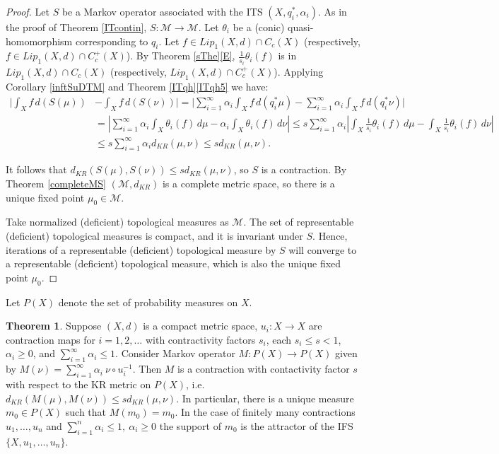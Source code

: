 \documentclass[sn-mathphys-num]{sn-jnl}%
\theoremstyle{thmstyleone}%
\theoremstyle{definition}
\newtheorem{theorem}{Theorem}%
\begin{document}
\begin{proof}
Let  $S$ be a Markov operator associated with the ITS  $(X,  q_i^*, \alpha_i)$.
As in the proof of Theorem \ref{ITcontin}, $S :  \mathcal{M} \rightarrow \mathcal{M}$. 
Let $ \theta_i$ be a (conic) quasi-homomorphism corresponding to $q_i$. Let $f  \in  Lip_1(X,d) \cap C_c(X)$ 
(respectively, $f  \in  Lip_1(X,d) \cap C_c^+(X)$).
By Theorem \ref{sThe}\ref{E},  $\frac{1}{s_i} \theta_i(f)$ is in $  Lip_1(X,d) \cap C_c(X)$ (respectively, $  Lip_1(X,d) \cap C_c^+(X)$).
Applying  Corollary \ref{inftSuDTM} and Theorem \ref{ITqh}\ref{ITqh5} we have:
\begin{align*}
| \int_X f \, d(S(\mu))  & -  \int_X f \, d(S(\nu)) | = |\sum_{i=1}^\infty \alpha_i \int_X f \, d(q_i^* \mu) - \sum_{i=1}^\infty \alpha_i \int_X f \, d(q_i^* \nu) | \\
& = |  \sum_{i=1}^\infty \alpha_i   \int_X \theta_i(f) \, d \mu - \alpha_i  \int_X \theta_i(f) \, d \nu |  
\le s \sum_{i=1}^\infty \alpha_i   | \int_X  \frac {1}{s_i} \theta_i(f) \, d \mu - \int_X   \frac {1}{s_i} \theta_i(f) \, d \nu |   \\
& \le s \sum_{i=1}^\infty \alpha_i d_{KR} (\mu, \nu)  \le  s d_{KR} (\mu, \nu).
\end{align*}

It follows that $d_{KR} (S(\mu), S(\nu)) \le  s d_{KR} (\mu, \nu)$, so $S$ is a contraction.  
By Theorem \ref{completeMS} $(\mathcal{M}, d_{KR})$ is a complete metric space, so there is a unique fixed point $\mu_0 \in \mathcal{M}$. 

Take normalized (deficient) topological measures as  $\mathcal{M}$. The set of representable (deficient) topological measures is compact, 
and it is invariant under $S$. Hence, iterations of a representable (deficient) topological measure
by $S$ will converge to a representable (deficient) topological measure, which is also the unique fixed point  $\mu_0$. 
\end{proof}

Let $P(X)$ denote the set of probability measures on $X$.

\begin{theorem} \label{Barnsley}
Suppose $(X, d)$ is a compact metric space, $u_i :X \longrightarrow X$ are contraction maps for $ i =1,2, \ldots$ with contractivity factors
$s_i$, each $ s_i \le s <1$, $ \alpha_i \ge 0$,  
and $ \sum_{i=1}^\infty \alpha_i \le 1$.  Consider  Markov operator 
$M: P(X) \longrightarrow P(X)$ given by 
$ M(\nu) = \sum_{i=1}^\infty \alpha_i \  \nu \circ u_i^{-1}.$
Then $M$ is a contraction with contactivity factor $ s$ with respect to the KR metric on $P(X)$, i.e.  
$d_{KR}(M(\mu), M(\nu)) \le s d_{KR}(\mu, \nu).$
In particular, there is a unique measure $m_0 \in P(X)$ such that $ M(m_0) = m_0$.
In the case of finitely many contractions $u_1, \ldots, u_n$ and  $ \sum_{i=1}^n \alpha_i \le 1, \   \alpha_i \ge 0$ 
the support of  $m_0$ is the attractor of the IFS $ \{X, u_1, \ldots, u_n\}$. 
\end{theorem}
\end{document}
